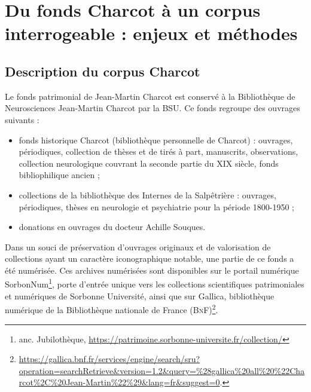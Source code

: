 \section{Du fonds Charcot à un corpus interrogeable : enjeux et méthodes}
\label{sect:corpus}
\subsection{Description du corpus Charcot}
Le fonds patrimonial de Jean-Martin Charcot est conservé à la Bibliothèque de Neurosciences Jean-Martin Charcot par la BSU.
 Ce fonds regroupe des ouvrages suivants : 
\begin{itemize}
\item fonds historique Charcot (bibliothèque personnelle de Charcot) : ouvrages, périodiques, collection de thèses et de tirés à part, manuscrits, observations, collection neurologique couvrant la seconde partie du XIX\ieme{} siècle, fonds bibliophilique ancien ;
\item collections de la bibliothèque des Internes de la Salpêtrière : ouvrages, périodiques, thèses en neurologie et psychiatrie pour la période 1800-1950 ;
\item donations en ouvrages du docteur Achille Souques.
\end{itemize}
\medskip
Dans un souci de préservation d'ouvrages originaux et de valorisation de collections ayant un caractère iconographique notable, une partie de ce fonds a été numérisée. Ces archives numérisées sont disponibles sur le portail numérique
SorbonNum\footnote{anc. Jubilothèque, \url{https://patrimoine.sorbonne-universite.fr/collection/}}, porte d'entrée unique vers les collections scientifiques patrimoniales et numériques de Sorbonne Université, ainsi que sur Gallica, bibliothèque numérique de la Bibliothèque nationale de France (\textsc{BnF})\footnote{\url{https://gallica.bnf.fr/services/engine/search/sru?operation=searchRetrieve&version=1.2&query=\%28gallica\%20all\%20\%22Charcot\%2C\%20Jean-Martin\%22\%29&lang=fr&suggest=0}.}.


